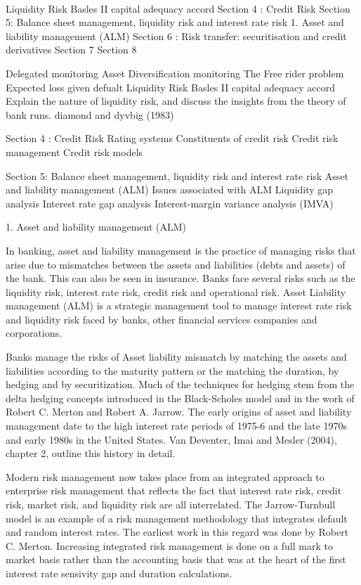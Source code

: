 



Liquidity Risk
Basles II capital adequacy accord
Section 4 : Credit Risk
Section 5: Balance sheet management, liquidity risk and interest rate risk
1. Asset and liability management (ALM)
Section 6 : Risk transfer: securitisation and credit derivatives
Section 7
Section 8






Delegated monitoring
Asset Diversification monitoring
The Free rider problem
Expected loss given defualt
Liquidity Risk
Basles II capital adequacy accord
Explain the nature of liquidity risk, and discuss the insights from the theory of bank runs.
diamond and dyvbig (1983)
 
Section 4 : Credit Risk
Rating systems 
Constituents of credit risk 
Credit risk management
Credit risk models


Section 5: Balance sheet management, liquidity risk and interest rate risk
Asset and liability management (ALM)
Issues associated with ALM
Liquidity gap analysis 
Interest rate gap analysis 
Interest-margin variance analysis (IMVA)


1. Asset and liability management (ALM)




In banking, asset and liability management is the practice of managing risks that arise due to mismatches between the assets and liabilities (debts and assets) of the bank. This can also be seen in insurance.
Banks face several risks such as the liquidity risk, interest rate risk, credit risk and operational risk. Asset Liability management (ALM) is a strategic management tool to manage interest rate risk and liquidity risk faced by banks, other financial services companies and corporations.


Banks manage the risks of Asset liability mismatch by matching the assets and liabilities according to the maturity pattern or the matching the duration, by hedging and by securitization. Much of the techniques for hedging stem from the delta hedging concepts introduced in the Black-Scholes model and in the work of Robert C. Merton and Robert A. Jarrow. The early origins of asset and liability management date to the high interest rate periods of 1975-6 and the late 1970s and early 1980s in the United States. Van Deventer, Imai and Mesler (2004), chapter 2, outline this history in detail.


Modern risk management now takes place from an integrated approach to enterprise risk management that reflects the fact that interest rate risk, credit risk, market risk, and liquidity risk are all interrelated. The Jarrow-Turnbull model is an example of a risk management methodology that integrates default and random interest rates. The earliest work in this regard was done by Robert C. Merton. Increasing integrated risk management is done on a full mark to market basis rather than the accounting basis that was at the heart of the first interest rate sensivity gap and duration calculations.


